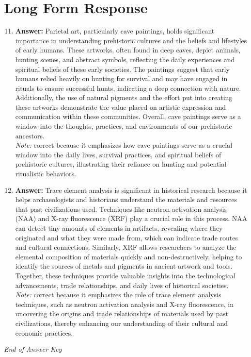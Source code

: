 \documentclass[12pt]{article}
\begin{document}
\section*{Long Form Response}
\begin{enumerate}[label=\arabic*.]
\setcounter{enumi}{10}
\item \textbf{Answer:} Parietal art, particularly cave paintings, holds significant importance in understanding prehistoric cultures and the beliefs and lifestyles of early humans. These artworks, often found in deep caves, depict animals, hunting scenes, and abstract symbols, reflecting the daily experiences and spiritual beliefs of these early societies. The paintings suggest that early humans relied heavily on hunting for survival and may have engaged in rituals to ensure successful hunts, indicating a deep connection with nature. Additionally, the use of natural pigments and the effort put into creating these artworks demonstrate the value placed on artistic expression and communication within these communities. Overall, cave paintings serve as a window into the thoughts, practices, and environments of our prehistoric ancestors.
\\ \textit{Note:} correct because it emphasizes how cave paintings serve as a crucial window into the daily lives, survival practices, and spiritual beliefs of prehistoric cultures, illustrating their reliance on hunting and potential ritualistic behaviors.
\item \textbf{Answer:} Trace element analysis is significant in historical research because it helps archaeologists and historians understand the materials and resources that past civilizations used. Techniques like neutron activation analysis (NAA) and X-ray fluorescence (XRF) play a crucial role in this process. NAA can detect tiny amounts of elements in artifacts, revealing where they originated and what they were made from, which can indicate trade routes and cultural connections. Similarly, XRF allows researchers to analyze the elemental composition of materials quickly and non-destructively, helping to identify the sources of metals and pigments in ancient artwork and tools. Together, these techniques provide valuable insights into the technological advancements, trade relationships, and daily lives of historical societies.
\\ \textit{Note:} correct because it emphasizes the role of trace element analysis techniques, such as neutron activation analysis and X-ray fluorescence, in uncovering the origins and trade relationships of materials used by past civilizations, thereby enhancing our understanding of their cultural and economic practices.
\end{enumerate}

\vfill
\noindent\textit{End of Answer Key}
\end{document}
